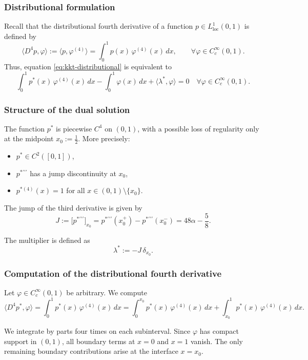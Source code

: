 \documentclass[11pt,a4paper]{article}
\begin{document}
\subsubsection*{Distributional formulation}

Recall that the distributional fourth derivative of a function
$p\in L^1_{\mathrm{loc}}(0,1)$ is defined by
\[
\langle D^4 p, \varphi \rangle
:=
\langle p, \varphi^{(4)} \rangle
=
\int_0^1 p(x)\,\varphi^{(4)}(x)\,dx,
\qquad
\forall \varphi\in C_c^\infty(0,1).
\]
Thus, equation \eqref{eq:kkt-distributional} is equivalent to
\begin{equation}
\int_0^1 p^*(x)\,\varphi^{(4)}(x)\,dx
-
\int_0^1 \varphi(x)\,dx
+
\langle \lambda^*, \varphi \rangle
= 0
\quad
\forall \varphi\in C_c^\infty(0,1).
\label{eq:kkt-test}
\end{equation}

\subsubsection*{Structure of the dual solution}

The function $p^*$ is piecewise $C^4$ on $(0,1)$, with a possible loss of
regularity only at the midpoint $x_0:=\tfrac12$.
More precisely:
\begin{itemize}
\item $p^*\in C^2([0,1])$,
\item $p^{*\prime\prime\prime}$ has a jump discontinuity at $x_0$,
\item $p^{*(4)}(x)=1$ for all $x\in(0,1)\setminus\{x_0\}$.
\end{itemize}

The jump of the third derivative is given by
\[
J := \big[p^{*\prime\prime\prime}\big]_{x_0}
=
p^{*\prime\prime\prime}(x_0^+) - p^{*\prime\prime\prime}(x_0^-)
=
48\alpha - \frac{5}{8}.
\]

The multiplier is defined as
\[
\lambda^* := -J\,\delta_{x_0}.
\]

\subsubsection*{Computation of the distributional fourth derivative}

Let $\varphi\in C_c^\infty(0,1)$ be arbitrary.
We compute
\[
\langle D^4 p^*, \varphi \rangle
=
\int_0^1 p^*(x)\,\varphi^{(4)}(x)\,dx
=
\int_0^{x_0} p^*(x)\,\varphi^{(4)}(x)\,dx
+
\int_{x_0}^{1} p^*(x)\,\varphi^{(4)}(x)\,dx.
\]

We integrate by parts four times on each subinterval.
Since $\varphi$ has compact support in $(0,1)$, all boundary terms at $x=0$ and
$x=1$ vanish.
The only remaining boundary contributions arise at the interface $x=x_0$.
\end{document}
